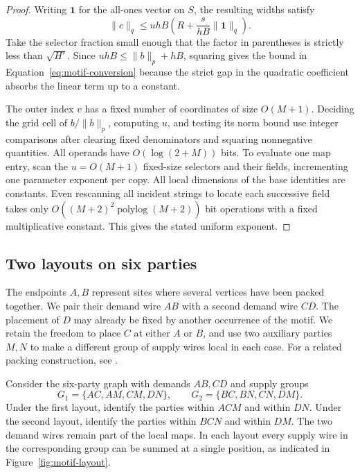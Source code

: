 \begin{proof}
Writing $\mathbf 1$ for the all-ones vector on $S$, the resulting widths
satisfy
\[
  \|c\|_q\le uhB\left(R+\frac{s}{hB}\|\mathbf 1\|_q\right).
\]
Take the selector fraction small enough that the factor in parentheses
is strictly less than $\sqrt{H'}$. Since $uhB\le\|b\|_p+hB$, squaring
gives the bound in Equation~\eqref{eq:motif-conversion} because the strict gap in the
quadratic coefficient absorbs the linear term up to a constant.

The outer index $v$ has a fixed number of coordinates of size $O(M+1)$.
Deciding the grid cell of $b/\|b\|_p$, computing $u$, and testing its
norm bound use integer comparisons after clearing fixed denominators and
squaring nonnegative quantities. All operands have $O(\log(2+M))$ bits.
To evaluate one map entry, scan the $u=O(M+1)$ fixed-size selectors and
their fields, incrementing one parameter exponent per copy. All local
dimensions of the base identities are constants. Even rescanning all
incident strings to locate each successive field takes only
$O((M+2)^2\operatorname{polylog}(M+2))$ bit operations with a fixed
multiplicative constant. This gives the stated uniform exponent.
\end{proof}

\subsection{Two layouts on six parties}
The endpoints $A,B$ represent sites where several vertices have been
packed together. We pair their demand wire $AB$ with a second demand
wire $CD$. The placement of $D$ may already be fixed by another
occurrence of the motif. We retain the freedom to place $C$ at either
$A$ or $B$, and use two auxiliary parties $M,N$ to make a different
group of supply wires local in each case. For a related packing
construction, see \cite[Appendix~D]{falseeth}.

Consider the six-party graph with demands $AB,CD$ and supply
groups
\[
 G_1=\{AC,AM,CM,DN\},\qquad G_2=\{BC,BN,CN,DM\}.
\]
Under the first layout, identify the parties within $ACM$ and within
$DN$. Under the second layout, identify the parties within $BCN$ and
within $DM$. The two demand wires remain part of the local maps. In each
layout every supply wire in the corresponding group can be summed at a
single position, as indicated in Figure~\ref{fig:motif-layout}.

